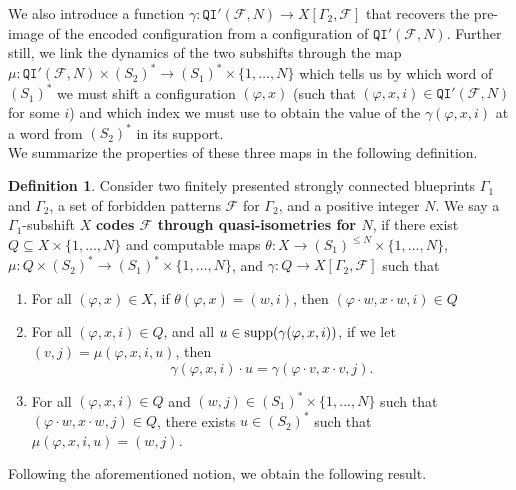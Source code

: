 \documentclass{article}
\theoremstyle{definition}
\newtheorem{defn}[theorem]{Definition} %
\theoremstyle{definition}
\newcommand{\Fo}{\mathcal{F}}
\newcommand{\QI}{\mathtt{QI}}
\newcommand{\supp}{\textnormal{supp}}
\newcommand{\define}[1]{\textbf{#1}}
\begin{document}
We also introduce a function $\gamma\colon \QI'(\Fo,N)\to X[\Gamma_2, \Fo]$ that recovers the pre-image of the encoded configuration from a configuration of $\QI'(\Fo, N)$. Further still, we link the dynamics of the two subshifts through the map $\mu\colon \QI'(\Fo,N)\times (S_2)^*\to (S_1)^*\times \{1,\dots,N\}$ which tells us by which word of $(S_1)^*$ we must shift a configuration $(\varphi, x)$ (such that $(\varphi, x,i)\in\QI'(\Fo,N)$ for some $i$) and which index we must use to obtain the value of the $\gamma(\varphi, x,i)$ at a word from $(S_2)^*$ in its support.\\

We summarize the properties of these three maps in the following definition.
\begin{defn}
\label{def:coding}
    Consider two finitely presented  strongly connected blueprints $\Gamma_1$ and $\Gamma_2$, a set of forbidden patterns $\Fo$ for $\Gamma_2$, and a positive integer $N$. We say a $\Gamma_1$-subshift $X$ \define{codes $\Fo$ through quasi-isometries for $N$}, if there exist  $Q\subseteq X\times\{1, ..., N\}$ and computable maps $\theta\colon X \to (S_1)^{\leq N} \times \{1,...,N\}$, $\mu\colon Q\times (S_2)^*\to (S_1)^* \times \{1,\dots,N\}$, and $\gamma\colon Q\to X[\Gamma_2, \Fo]$ such that
\begin{enumerate}
    \item For all $(\varphi, x)\in X$, if $\theta(\varphi, x)=(w,i)$, then $(\varphi\cdot w, x\cdot w, i)\in Q$
    
    \item For all $(\varphi, x, i)\in Q$, and all $u \in \supp(\gamma(\varphi, x, i))$, if we let $(v,j) = \mu(\varphi,x,i,u)$, then
        \[\gamma(\varphi, x, i)\cdot u = \gamma(\varphi\cdot v, x\cdot v, j).\]

        \item For all $(\varphi, x, i)\in Q$ and $(w,j)\in (S_1)^*\times \{1,...,N\}$ such that $(\varphi\cdot w, x\cdot w, j)\in Q$, there exists $u\in (S_2)^*$ such that $\mu(\varphi,x,i, u)=(w,j)$.
    \end{enumerate}
\end{defn}

Following the aforementioned notion, we obtain the following result.
\end{document}
